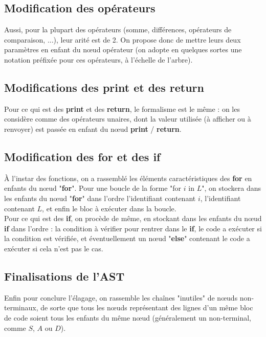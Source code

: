\documentclass[a4paper, 12pt]{report}
\begin{document}
\subsection{Modification des opérateurs}

Aussi, pour la plupart des opérateurs (somme, différences, opérateurs de comparaison, ...), leur arité est de 2. On propose donc de mettre leurs deux paramètres en enfant du n{\oe}ud opérateur (on adopte en quelques sortes une notation préfixée pour ces opérateurs, à l'échelle de l'arbre).\\

\subsection{Modifications des \textbf{print} et des \textbf{return}}

Pour ce qui est des \textbf{print} et des \textbf{return}, le formalisme est le même : on les considère comme des opérateurs unaires, dont la valeur utilisée (à afficher ou à renvoyer) est passée en enfant du n{\oe}ud \textbf{print} / \textbf{return}.\\

\subsection{Modification des \textbf{for} et des \textbf{if}}

À l'instar des fonctions, on a rassemblé les éléments caractéristiques des \textbf{for} en enfants du n{\oe}ud "\textbf{for}". Pour une boucle de la forme "for $i$ in $L$", on stockera dans les enfants du n{\oe}ud "\textbf{for}" dans l'ordre l'identifiant contenant $i$, l'identifiant contenant $L$, et enfin le bloc à exécuter dans la boucle.\\

Pour ce qui est des \textbf{if}, on procède de même, en stockant dans les enfants du n{\oe}ud \textbf{if} dans l'ordre : la condition à vérifier pour rentrer dans le \textbf{if}, le code a exécuter si la condition est vérifiée, et éventuellement un n{\oe}ud "\textbf{else}" contenant le code a exécuter si cela n'est pas le cas.\\

\subsection{Finalisations de l'AST}

Enfin pour conclure l'élagage, on rassemble les chaînes "inutiles" de n{\oe}uds non-terminaux, de sorte que tous les n{\oe}uds représentant des lignes d'un même bloc de code soient tous les enfants du même n{\oe}ud (généralement un non-terminal, comme $S$, $A$ ou $D$).\\
\end{document}
